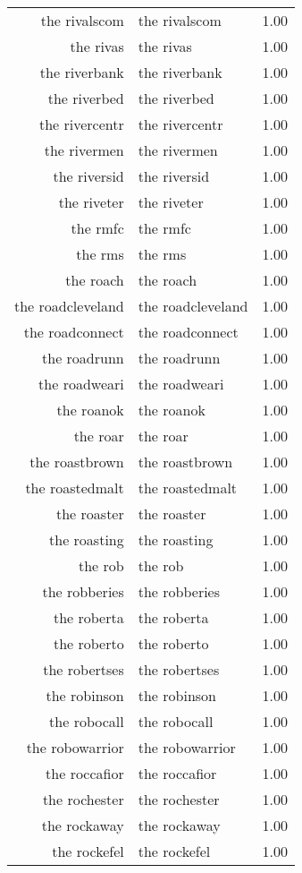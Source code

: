 \begin{table}[ht]
\begin{tabular}{rlr}
  the rivalscom & the rivalscom & 1.00 \\ 
  the rivas & the rivas & 1.00 \\ 
  the riverbank & the riverbank & 1.00 \\ 
  the riverbed & the riverbed & 1.00 \\ 
  the rivercentr & the rivercentr & 1.00 \\ 
  the rivermen & the rivermen & 1.00 \\ 
  the riversid & the riversid & 1.00 \\ 
  the riveter & the riveter & 1.00 \\ 
  the rmfc & the rmfc & 1.00 \\ 
  the rms & the rms & 1.00 \\ 
  the roach & the roach & 1.00 \\ 
  the roadcleveland & the roadcleveland & 1.00 \\ 
  the roadconnect & the roadconnect & 1.00 \\ 
  the roadrunn & the roadrunn & 1.00 \\ 
  the roadweari & the roadweari & 1.00 \\ 
  the roanok & the roanok & 1.00 \\ 
  the roar & the roar & 1.00 \\ 
  the roastbrown & the roastbrown & 1.00 \\ 
  the roastedmalt & the roastedmalt & 1.00 \\ 
  the roaster & the roaster & 1.00 \\ 
  the roasting & the roasting & 1.00 \\ 
  the rob & the rob & 1.00 \\ 
  the robberies & the robberies & 1.00 \\ 
  the roberta & the roberta & 1.00 \\ 
  the roberto & the roberto & 1.00 \\ 
  the robertses & the robertses & 1.00 \\ 
  the robinson & the robinson & 1.00 \\ 
  the robocall & the robocall & 1.00 \\ 
  the robowarrior & the robowarrior & 1.00 \\ 
  the roccafior & the roccafior & 1.00 \\ 
  the rochester & the rochester & 1.00 \\ 
  the rockaway & the rockaway & 1.00 \\ 
  the rockefel & the rockefel & 1.00 \\ 

\end{tabular}
\end{table}
